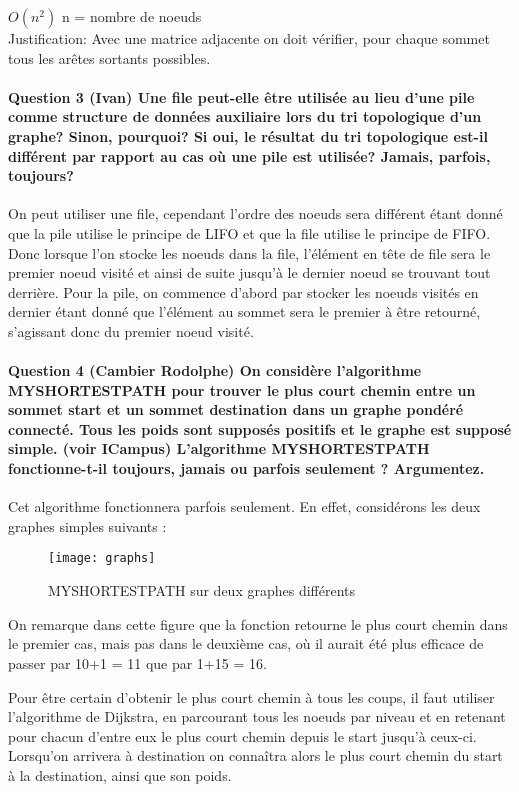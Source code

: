 \documentclass[a4paper]{article}
\begin{document}
$ O(n^2) $ 	n = nombre de noeuds\\
Justification: Avec une matrice adjacente on doit vérifier, pour chaque sommet  tous les arêtes sortants possibles.


\paragraph{Question 3 (Ivan) Une file peut-elle être utilisée au lieu d'une pile comme structure de données auxiliaire lors du tri topologique d'un graphe? Sinon, pourquoi? Si oui, le résultat du tri topologique est-il différent par rapport au cas où une pile est utilisée? Jamais, parfois, toujours? \\}

On peut utiliser une file, cependant l'ordre des noeuds sera différent étant donné que la pile utilise le principe de LIFO et que la file utilise le principe de FIFO. Donc lorsque l'on stocke les noeuds dans la file, l'élément en tête de file sera le premier noeud visité et ainsi de suite jusqu'à le dernier noeud se trouvant tout derrière. Pour la pile, on commence d'abord par stocker les noeuds visités en dernier étant donné que l'élément au sommet sera le premier à être retourné, s'agissant donc du premier noeud visité. \\


\paragraph{Question 4 (Cambier Rodolphe) On considère l’algorithme MYSHORTESTPATH pour trouver le plus court chemin
entre un sommet start et un sommet destination dans un graphe pondéré
connecté. Tous les poids sont supposés positifs et le graphe est supposé simple. (voir ICampus) 
L’algorithme MYSHORTESTPATH fonctionne-t-il toujours, jamais ou parfois seulement
? Argumentez.} Cet algorithme fonctionnera parfois seulement. En effet, considérons les deux graphes simples suivants :

\begin{figure}[H]
\centering
\texttt{[image: graphs]}
\caption{MYSHORTESTPATH sur deux graphes différents}
\end{figure} 

On remarque dans cette figure que la fonction retourne le plus court chemin dans le premier cas, mais pas dans le deuxième cas, où il aurait été plus efficace de passer par 10+1 = 11 que par 1+15 = 16. 

Pour être certain d'obtenir le plus court chemin à tous les coups, il faut utiliser l'algorithme de Dijkstra, en parcourant tous les noeuds par niveau et en retenant pour chacun d'entre eux le plus court chemin depuis le start jusqu'à ceux-ci. Lorsqu'on arrivera à destination on connaîtra alors le plus court chemin du start à la destination, ainsi que son poids.
\end{document}
